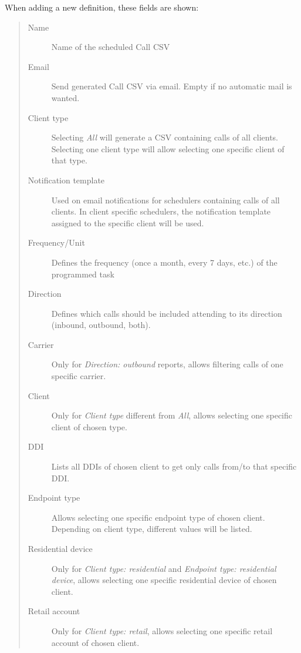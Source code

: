 \documentclass[letterpaper,10pt,english]{sphinxmanual}
\begin{document}
When adding a new definition, these fields are shown:
\begin{quote}
\begin{description}
\item[{Name}] \leavevmode
Name of the scheduled Call CSV

\item[{Email}] \leavevmode
Send generated Call CSV via email. Empty if no automatic mail is wanted.

\item[{Client type}] \leavevmode
Selecting \emph{All} will generate a CSV containing calls of all clients. Selecting one client type
will allow selecting one specific client of that type.

\item[{Notification template}] \leavevmode
Used on email notifications for schedulers containing calls of all clients. In client specific
schedulers, the notification template assigned to the specific client will be used.

\item[{Frequency/Unit}] \leavevmode
Defines the frequency (once a month, every 7 days, etc.) of the programmed task

\item[{Direction}] \leavevmode
Defines which calls should be included attending to its direction (inbound, outbound, both).

\item[{Carrier}] \leavevmode
Only for \emph{Direction: outbound} reports, allows filtering calls of one specific carrier.

\item[{Client}] \leavevmode
Only for \emph{Client type} different from \emph{All}, allows selecting one specific client of chosen type.

\item[{DDI}] \leavevmode
Lists all DDIs of chosen client to get only calls from/to that specific DDI.

\item[{Endpoint type}] \leavevmode
Allows selecting one specific endpoint type of chosen client. Depending on client type, different values will
be listed.

\item[{Residential device}] \leavevmode
Only for \emph{Client type: residential} and \emph{Endpoint type: residential device}, allows selecting one specific residential device of chosen client.

\item[{Retail account}] \leavevmode
Only for \emph{Client type: retail}, allows selecting one specific retail account of chosen client.


\end{description}
\end{quote}
\end{document}
